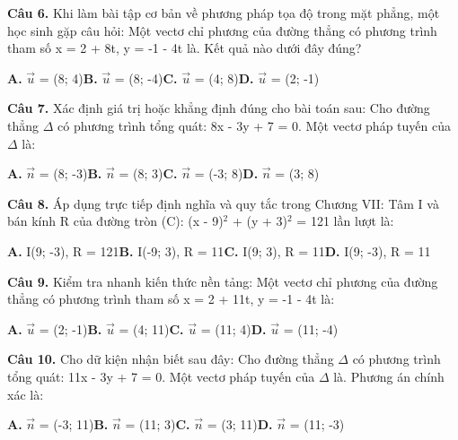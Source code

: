 \documentclass[11pt,a4paper]{article}
\begin{document}
\textbf{\color{primary} Câu 6.} Khi làm bài tập cơ bản về phương pháp tọa độ trong mặt phẳng, một học sinh gặp câu hỏi: Một vectơ chỉ phương của đường thẳng có phương trình tham số x = 2 + 8t, y = -1 - 4t là. Kết quả nào dưới đây đúng?\par
\hspace*{1.5em}\textbf{A.} $\vec{u}$ = (8; 4)\quad\quad \textbf{B.} $\vec{u}$ = (8; -4)\quad\quad \textbf{C.} $\vec{u}$ = (4; 8)\quad\quad \textbf{D.} $\vec{u}$ = (2; -1)\par\vspace{2pt}
\textbf{\color{primary} Câu 7.} Xác định giá trị hoặc khẳng định đúng cho bài toán sau: Cho đường thẳng $\Delta$ có phương trình tổng quát: 8x - 3y + 7 = 0. Một vectơ pháp tuyến của $\Delta$ là:\par
\hspace*{1.5em}\textbf{A.} $\vec{n}$ = (8; -3)\quad\quad \textbf{B.} $\vec{n}$ = (8; 3)\quad\quad \textbf{C.} $\vec{n}$ = (-3; 8)\quad\quad \textbf{D.} $\vec{n}$ = (3; 8)\par\vspace{2pt}
\textbf{\color{primary} Câu 8.} Áp dụng trực tiếp định nghĩa và quy tắc trong Chương VII: Tâm I và bán kính R của đường tròn (C): (x - 9)$^2$ + (y + 3)$^2$ = 121 lần lượt là:\par
\hspace*{1.5em}\textbf{A.} I(9; -3), R = 121\quad\quad \textbf{B.} I(-9; 3), R = 11\quad\quad \textbf{C.} I(9; 3), R = 11\quad\quad \textbf{D.} I(9; -3), R = 11\par\vspace{2pt}
\textbf{\color{primary} Câu 9.} Kiểm tra nhanh kiến thức nền tảng: Một vectơ chỉ phương của đường thẳng có phương trình tham số x = 2 + 11t, y = -1 - 4t là:\par
\hspace*{1.5em}\textbf{A.} $\vec{u}$ = (2; -1)\quad\quad \textbf{B.} $\vec{u}$ = (4; 11)\quad\quad \textbf{C.} $\vec{u}$ = (11; 4)\quad\quad \textbf{D.} $\vec{u}$ = (11; -4)\par\vspace{2pt}
\textbf{\color{primary} Câu 10.} Cho dữ kiện nhận biết sau đây: Cho đường thẳng $\Delta$ có phương trình tổng quát: 11x - 3y + 7 = 0. Một vectơ pháp tuyến của $\Delta$ là. Phương án chính xác là:\par
\hspace*{1.5em}\textbf{A.} $\vec{n}$ = (-3; 11)\quad\quad \textbf{B.} $\vec{n}$ = (11; 3)\quad\quad \textbf{C.} $\vec{n}$ = (3; 11)\quad\quad \textbf{D.} $\vec{n}$ = (11; -3)\par\vspace{2pt}
\end{document}
